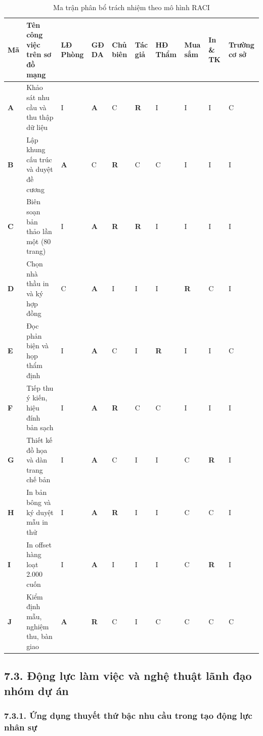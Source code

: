 \begin{table}[htbp]
\centering
\caption{Ma trận phân bổ trách nhiệm theo mô hình RACI}
\label{tab:raci}
\small
{}
\begin{tabularx}{\textwidth}{|C{0.6cm}|Y|C{0.9cm}|C{0.9cm}|C{0.9cm}|C{0.9cm}|C{0.9cm}|C{0.9cm}|C{0.9cm}|C{0.9cm}|}
\hline
\textbf{Mã} & \textbf{Tên công việc trên sơ đồ mạng} & \textbf{LĐ Phòng} & \textbf{GĐ DA} & \textbf{Chủ biên} & \textbf{Tác giả} & \textbf{HĐ Thẩm} & \textbf{Mua sắm} & \textbf{In \& TK} & \textbf{Trường cơ sở} \\
\hline
\textbf{A} & Khảo sát nhu cầu và thu thập dữ liệu & I & \textbf{A} & C & \textbf{R} & I & I & I & C \\
\hline
\textbf{B} & Lập khung cấu trúc và duyệt đề cương & \textbf{A} & C & \textbf{R} & C & C & I & I & I \\
\hline
\textbf{C} & Biên soạn bản thảo lần một (80 trang) & I & \textbf{A} & \textbf{R} & \textbf{R} & I & I & I & I \\
\hline
\textbf{D} & Chọn nhà thầu in và ký hợp đồng & C & \textbf{A} & I & I & I & \textbf{R} & C & I \\
\hline
\textbf{E} & Đọc phản biện và họp thẩm định & I & \textbf{A} & C & I & \textbf{R} & I & I & C \\
\hline
\textbf{F} & Tiếp thu ý kiến, hiệu đính bản sạch & I & \textbf{A} & \textbf{R} & C & C & I & I & I \\
\hline
\textbf{G} & Thiết kế đồ họa và dàn trang chế bản & I & \textbf{A} & C & I & I & C & \textbf{R} & I \\
\hline
\textbf{H} & In bản bông và ký duyệt mẫu in thử & I & \textbf{A} & \textbf{R} & I & I & C & C & I \\
\hline
\textbf{I} & In offset hàng loạt 2.000 cuốn & I & \textbf{A} & I & I & I & C & \textbf{R} & I \\
\hline
\textbf{J} & Kiểm định mẫu, nghiệm thu, bàn giao & \textbf{A} & \textbf{R} & C & I & C & C & C & C \\
\hline
\end{tabularx}
\end{table}

\subsection{7.3. Động lực làm việc và nghệ thuật lãnh đạo nhóm dự án}

\subsubsection{7.3.1. Ứng dụng thuyết thứ bậc nhu cầu trong tạo động lực nhân sự}

